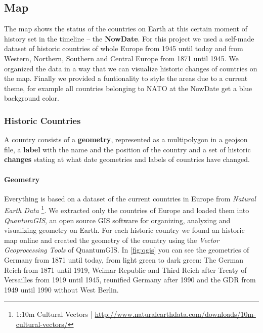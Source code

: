 \subsection{Map}
The map shows the status of the countries on Earth at this certain moment of history set in the timeline -- the \textbf{NowDate}. For this project we used a self-made dataset of historic countries of whole Europe from 1945 until today and from Western, Northern, Southern and Central Europe from 1871 until 1945. We organized the data in a way that we can visualize historic changes of countries on the map. Finally we provided a funtionality to style the areas due to a current theme, for example all countries belonging to NATO at the NowDate get a blue background color.

\subsubsection{Historic Countries} %
\label{ssub:historic_countries}

A country consists of a \textbf{geometry}, represented as a multipolygon in a geojson file, a \textbf{label} with the name and the position of the country and a set of historic \textbf{changes} stating at what date geometries and labels of countries have changed.

\paragraph{Geometry} %
Everything is based on a dataset of the current countries in Europe from \textit{Natural Earth Data}
\footnote{1:10m Cultural Vectors | \url{http://www.naturalearthdata.com/downloads/10m-cultural-vectors/}}.
We extracted only the countries of Europe and loaded them into \textit{QuantumGIS}, an open source GIS software for organizing, analyzing and visualizing geometry on Earth. For each historic country we found an historic map online and created the geometry of the country using the \textit{Vector Geoprocessing Tools} of QuantumGIS. In \ref{fig:qgis} you can see the geometries of Germany from 1871 until today, from light green to dark green: The German Reich from 1871 until 1919, Weimar Republic and Third Reich after Treaty of Versailles from 1919 until 1945, reunified Germany after 1990 and the GDR from 1949 until 1990 without West Berlin.

